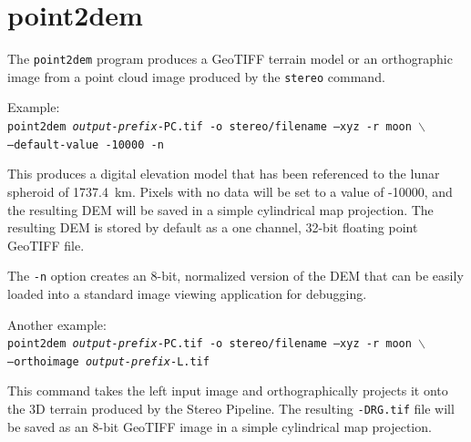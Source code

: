 
\section{point2dem}
\label{point2dem}

The \texttt{point2dem} program produces a GeoTIFF terrain model or an orthographic image from a point cloud image produced by the {\tt stereo} command.

Example:\\
\hspace*{2em}\texttt{point2dem \textit{output-prefix}-PC.tif -o stereo/filename --xyz -r moon $\backslash$} \\
\hspace*{4em}\texttt{--default-value -10000 -n}

This produces a digital elevation model that has been referenced to
the lunar spheroid of 1737.4~km.  Pixels with no data will be set to a
value of -10000, and the resulting \ac{DEM} will be saved in a simple
cylindrical map projection.  The resulting \ac{DEM} is stored by default as
a one channel, 32-bit floating point GeoTIFF file.

The {\tt -n} option creates an 8-bit, normalized version of the DEM
that can be easily loaded into a standard image viewing application
for debugging.

Another example: \\
\hspace*{2em}\texttt{point2dem \textit{output-prefix}-PC.tif -o stereo/filename --xyz -r moon $\backslash$} \\
\hspace*{4em}\texttt{--orthoimage \textit{output-prefix}-L.tif}

This command takes the left input image and orthographically projects
it onto the 3D terrain produced by the Stereo Pipeline.  The resulting
{\tt *-DRG.tif} file will be saved as an 8-bit GeoTIFF image in a
simple cylindrical map projection.

